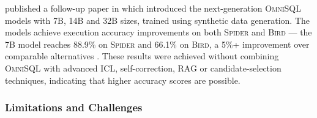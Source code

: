 \citeauthor*{OmniSQL} published a follow-up paper in \citeyear{OmniSQL} which
introduced the next-generation \textsc{OmniSQL} models with 7B, 14B and 32B
sizes, trained using synthetic data generation. The models achieve execution
accuracy improvements on both \textsc{Spider} and \textsc{Bird} — the 7B model
reaches 88.9\% on \textsc{Spider} and 66.1\% on \textsc{Bird}, a 5\%+
improvement over comparable alternatives \citep{OmniSQL}. These results were
achieved without combining \textsc{OmniSQL} with advanced ICL, self-correction,
RAG or candidate-selection techniques, indicating that higher accuracy scores
are possible.

\subsubsection{Limitations and Challenges}

